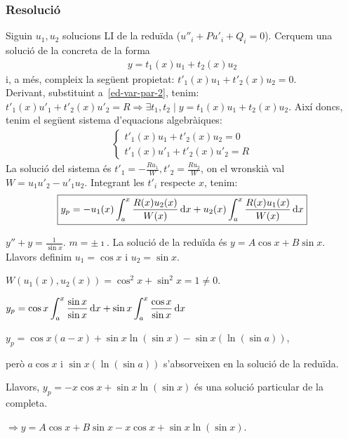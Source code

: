 \subsubsection*{Resolució}
Siguin $u_{1}, u_{2}$ solucions LI de la reduïda ($u''_{i} + Pu'_{i} + Q_{i} = 0$). Cerquem una solució de la concreta de la forma
\begin{align*}
	y = t_{1}(x) u_{1} + t_{2}(x) u_{2}
\end{align*}
i, a més, compleix la següent propietat: $t'_{1}(x) u_{1} + t'_{2}(x) u_{2} = 0$.
\\
Derivant, substituint a~\eqref{ed-var-par-2}, tenim: $t'_{1}(x) u'_{1} + t'_{2}(x) u'_{2} = R \Rightarrow \exists t_{1}, t_{2} \mid y = t_{1}(x) u_{1} + t_{2}(x) u_{2}$. Així doncs, tenim el següent sistema d'equacions algebràiques:
\begin{align*}
	\begin{cases} t'_{1}(x) u_{1} + t'_{2}(x) u_{2} = 0 \\ t'_{1}(x) u'_{1} + t'_{2}(x) u'_{2} = R \end{cases}
\end{align*}
La solució del sistema és $\displaystyle t'_{1} = - \frac{Ru_{1}}{W}, t'_{2} = \frac{Ru_{2}}{W}$, on el wronskià val $W = u_{1} u'_{2} - u'_{1} u_{2}$. Integrant les $t'_{i}$ respecte $x$, tenim:
\begin{align}
	\boxed{y_{p} = - u_{1}(x) \int_{a}^{x} \frac{R(x) u_{2}(x)}{W(x)} \mathop{}\!\mathrm{d} x + u_{2}(x) \int_{a}^{x} \frac{R(x) u_{1}(x)}{W(x)} \mathop{}\!\mathrm{d} x}
\end{align}

\begin{example}
    $\displaystyle y'' + y = \frac{1}{\sin x}$. $m = \pm \imath$.
    La solució de la reduïda és $\boxed{y = A \cos x + B \sin x}$. Llavors definim $u_{1} = \cos x$ i $u_{2} = \sin x$.

    $W(u_{1}(x), u_{2}(x)) = \cos^{2} x + \sin^{2} x = 1 \neq 0$.

    $\displaystyle y_{p} = \cos x \int_{a}^{x} \frac{\sin x}{\sin x} \mathop{}\!\mathrm{d} x + \sin x \int_{a}^{x} \frac{\cos x}{\sin x} \mathop{}\!\mathrm{d} x$

    $y_{p} = \cos x (a-x) + \sin x \ln (\sin x) - \sin x (\ln (\sin a))$,

    però $a \cos x$ i  $\sin x (\ln (\sin a))$ s'absorveixen en la solució de la reduïda.

    Llavors, $\boxed{y_{p} = - x \cos x + \sin x \ln (\sin x)}$ és una solució particular de la completa.

    $\Rightarrow \boxed{y = A \cos x + B \sin x - x \cos x + \sin x \ln (\sin x)}$.
\end{example}

